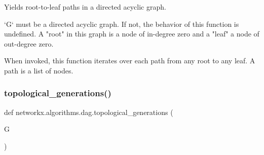 \begin{DoxyVerb}Yields root-to-leaf paths in a directed acyclic graph.

`G` must be a directed acyclic graph. If not, the behavior of this
function is undefined. A "root" in this graph is a node of in-degree
zero and a "leaf" a node of out-degree zero.

When invoked, this function iterates over each path from any root to
any leaf. A path is a list of nodes.\end{DoxyVerb}
 \mbox{\label{namespacenetworkx_1_1algorithms_1_1dag_a90baa3a72db8f7a1da7098d87c7e64b4}} 
\subsubsection{\texorpdfstring{topological\+\_\+generations()}{topological\_generations()}}
{\footnotesize\ttfamily def networkx.\+algorithms.\+dag.\+topological\+\_\+generations (\begin{DoxyParamCaption}\item[{}]{G }\end{DoxyParamCaption})}

